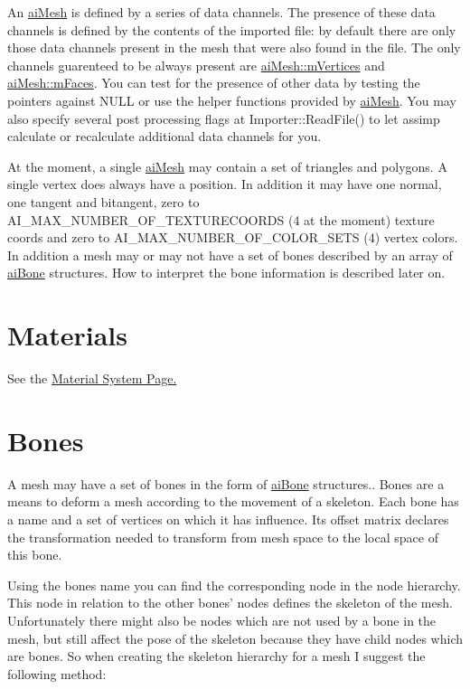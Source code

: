 An \hyperlink{structai_mesh}{ai\+Mesh} is defined by a series of data channels. The presence of these data channels is defined by the contents of the imported file\+: by default there are only those data channels present in the mesh that were also found in the file. The only channels guarenteed to be always present are \hyperlink{structai_mesh_afd4588abb3e1c72821ae0234a3850662}{ai\+Mesh\+::m\+Vertices} and \hyperlink{structai_mesh_a5a65fbc7fdea7f8d36f39047425ece07}{ai\+Mesh\+::m\+Faces}. You can test for the presence of other data by testing the pointers against N\+U\+L\+L or use the helper functions provided by \hyperlink{structai_mesh}{ai\+Mesh}. You may also specify several post processing flags at Importer\+::\+Read\+File() to let assimp calculate or recalculate additional data channels for you.

At the moment, a single \hyperlink{structai_mesh}{ai\+Mesh} may contain a set of triangles and polygons. A single vertex does always have a position. In addition it may have one normal, one tangent and bitangent, zero to A\+I\+\_\+\+M\+A\+X\+\_\+\+N\+U\+M\+B\+E\+R\+\_\+\+O\+F\+\_\+\+T\+E\+X\+T\+U\+R\+E\+C\+O\+O\+R\+D\+S (4 at the moment) texture coords and zero to A\+I\+\_\+\+M\+A\+X\+\_\+\+N\+U\+M\+B\+E\+R\+\_\+\+O\+F\+\_\+\+C\+O\+L\+O\+R\+\_\+\+S\+E\+T\+S (4) vertex colors. In addition a mesh may or may not have a set of bones described by an array of \hyperlink{structai_bone}{ai\+Bone} structures. How to interpret the bone information is described later on.\hypertarget{importer_notes_material}{}\section{Materials}\label{importer_notes_material}
See the \hyperlink{materials}{Material System Page. }\hypertarget{data_bones}{}\section{Bones}\label{data_bones}
A mesh may have a set of bones in the form of \hyperlink{structai_bone}{ai\+Bone} structures.. Bones are a means to deform a mesh according to the movement of a skeleton. Each bone has a name and a set of vertices on which it has influence. Its offset matrix declares the transformation needed to transform from mesh space to the local space of this bone.

Using the bones name you can find the corresponding node in the node hierarchy. This node in relation to the other bones' nodes defines the skeleton of the mesh. Unfortunately there might also be nodes which are not used by a bone in the mesh, but still affect the pose of the skeleton because they have child nodes which are bones. So when creating the skeleton hierarchy for a mesh I suggest the following method\+:

